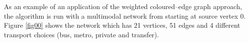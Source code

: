 \documentclass[preprint,authoryear,12pt]{elsarticle}
\begin{document}
As an example of an application of the weighted
coloured--edge graph approach, the algorithm is run with a
multimodal network from \cite{Lozano2001} starting at source vertex $0$.
Figure \ref{fig00} shows the network which has 21 vertices,
51 edges and 4 different transport choices
(bus, metro, private and transfer).
\begin{figure}
\end{figure}
\end{document}
